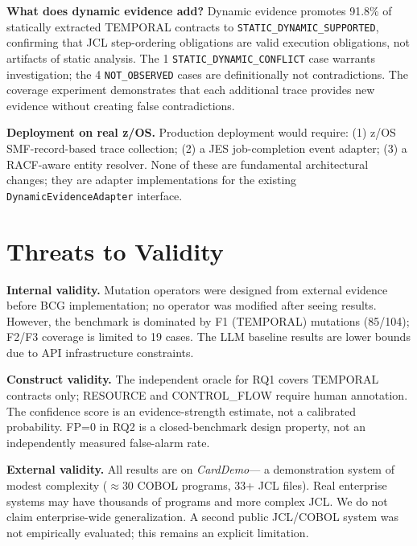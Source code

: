 \documentclass[sigconf,anonymous,review]{acmart}
\newcommand{\carddemo}{\textit{CardDemo}\xspace}
\newcommand{\notobs}{\texttt{NOT\_OBSERVED}\xspace}
\newcommand{\supported}{\texttt{STATIC\_DYNAMIC\_SUPPORTED}\xspace}
\newcommand{\conflict}{\texttt{STATIC\_DYNAMIC\_CONFLICT}\xspace}
\begin{document}
\textbf{What does dynamic evidence add?}
Dynamic evidence promotes 91.8\% of statically extracted TEMPORAL contracts to
\supported, confirming that JCL step-ordering obligations are valid execution
obligations, not artifacts of static analysis.
The 1 \conflict case warrants investigation; the 4 \notobs cases are definitionally
not contradictions.
The coverage experiment demonstrates that each additional trace provides new evidence
without creating false contradictions.

\textbf{Deployment on real z/OS.}
Production deployment would require: (1) z/OS SMF-record-based trace collection;
(2) a JES job-completion event adapter; (3) a RACF-aware entity resolver.
None of these are fundamental architectural changes; they are adapter implementations
for the existing \texttt{DynamicEvidenceAdapter} interface.

\section{Threats to Validity}\label{sec:threats}

\textbf{Internal validity.}
Mutation operators were designed from external evidence before BCG implementation;
no operator was modified after seeing results.
However, the benchmark is dominated by F1 (TEMPORAL) mutations (85/104); F2/F3
coverage is limited to 19 cases.
The LLM baseline results are lower bounds due to API infrastructure constraints.

\textbf{Construct validity.}
The independent oracle for RQ1 covers TEMPORAL contracts only; RESOURCE and
CONTROL\_FLOW require human annotation.
The confidence score is an evidence-strength estimate, not a calibrated probability.
FP=0 in RQ2 is a closed-benchmark design property, not an independently measured
false-alarm rate.

\textbf{External validity.}
All results are on \carddemo --- a demonstration system of modest complexity
($\approx30$ COBOL programs, 33+ JCL files).
Real enterprise systems may have thousands of programs and more complex JCL.
We do not claim enterprise-wide generalization.
A second public JCL/COBOL system was not empirically evaluated; this remains an
explicit limitation.
\end{document}
